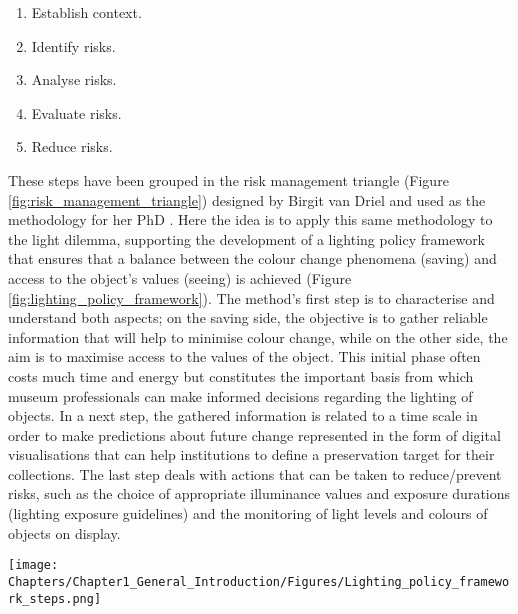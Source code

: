 

\begin{enumerate}
    \item Establish context.
    \item Identify risks.
    \item Analyse risks.
    \item Evaluate risks.
    \item Reduce risks.    
\end{enumerate}

These steps have been grouped in the risk management triangle (Figure \ref{fig:risk_management_triangle}) designed by Birgit van Driel and used as the methodology for her PhD  \citep[16]{van_driel_white_2018}. Here the idea is to apply this same methodology to the light dilemma, supporting the development of a lighting policy framework that ensures that a balance between the colour change phenomena (saving) and access to the object's values (seeing) is achieved (Figure \ref{fig:lighting_policy_framework}). The method’s first step is to characterise and understand both aspects; on the saving side, the objective is to gather reliable information that will help to minimise colour change, while on the other side, the aim is to maximise access to the values of the object. This initial phase often costs much time and energy but constitutes the important basis from which museum professionals can make informed decisions regarding the lighting of objects. In a next step, the gathered information is related to a time scale in order to make predictions about future change represented in the form of digital visualisations that can help institutions to define a preservation target for their collections. The last step deals with actions that can be taken to reduce/prevent risks, such as the choice of appropriate illuminance values and exposure durations (lighting exposure guidelines) and the monitoring of light levels and colours of objects on display. \\


\begin{figure*}[!h]
\centering
\texttt{[image: Chapters/Chapter1\_General\_Introduction/Figures/Lighting\_policy\_framework\_steps.png]}
\caption[\hspace{0.3cm}Lighting policy framework in a risk-based methodology]{Lighting policy framework in a risk-based methodology.}
\label{fig:lighting_policy_framework}
\end{figure*}

